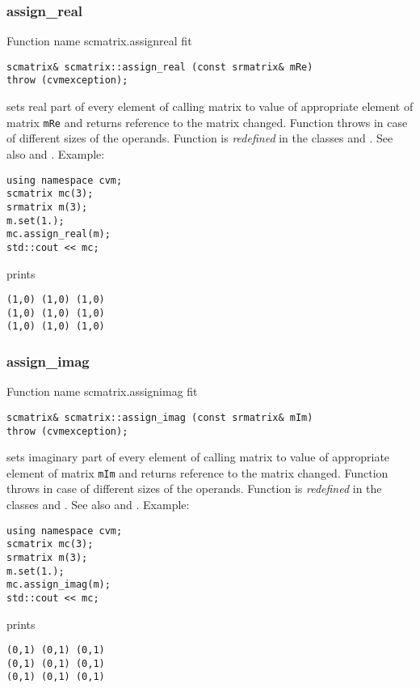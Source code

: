 \subsubsection{assign\_real}
Function%
\pdfdest name {scmatrix.assignreal} fit
\begin{verbatim}
scmatrix& scmatrix::assign_real (const srmatrix& mRe)
throw (cvmexception);
\end{verbatim}
sets real part of every element of  calling matrix to  value of
appropriate element of  matrix \verb"mRe"
and returns  reference to
the matrix changed.
Function throws  
in case of different sizes of the operands.
Function is \emph{redefined} in the classes
and .
See also  and .
Example:
\begin{Verbatim}
using namespace cvm;
scmatrix mc(3);
srmatrix m(3);
m.set(1.);
mc.assign_real(m);
std::cout << mc;
\end{Verbatim}
prints
\begin{Verbatim}
(1,0) (1,0) (1,0)
(1,0) (1,0) (1,0)
(1,0) (1,0) (1,0)
\end{Verbatim}
\newpage




\subsubsection{assign\_imag}
Function%
\pdfdest name {scmatrix.assignimag} fit
\begin{verbatim}
scmatrix& scmatrix::assign_imag (const srmatrix& mIm)
throw (cvmexception);
\end{verbatim}
sets imaginary part of every element of  calling matrix to  value of
appropriate element of  matrix \verb"mIm"
and returns  reference to
the matrix changed.
Function throws  
in case of different sizes of the operands.
Function is \emph{redefined} in the classes
and .
See also  and .
Example:
\begin{Verbatim}
using namespace cvm;
scmatrix mc(3);
srmatrix m(3);
m.set(1.);
mc.assign_imag(m);
std::cout << mc;
\end{Verbatim}
prints
\begin{Verbatim}
(0,1) (0,1) (0,1)
(0,1) (0,1) (0,1)
(0,1) (0,1) (0,1)
\end{Verbatim}
\newpage




